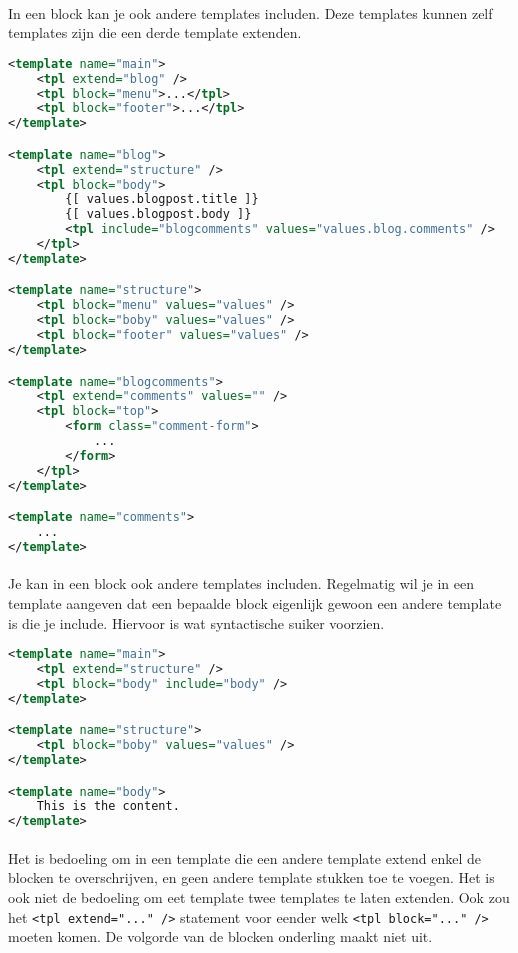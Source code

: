 \paragraph {} In een block kan je ook andere templates includen. Deze templates kunnen
zelf templates zijn die een derde template extenden.

\begin{lstlisting}[language=xml]
<template name="main">
	<tpl extend="blog" />
	<tpl block="menu">...</tpl>
	<tpl block="footer">...</tpl>
</template>

<template name="blog">
	<tpl extend="structure" />
	<tpl block="body">
		{[ values.blogpost.title ]}
		{[ values.blogpost.body ]}
		<tpl include="blogcomments" values="values.blog.comments" />
	</tpl>
</template>

<template name="structure">
	<tpl block="menu" values="values" />
	<tpl block="boby" values="values" />
	<tpl block="footer" values="values" />
</template>

<template name="blogcomments">
	<tpl extend="comments" values="" />
	<tpl block="top">
		<form class="comment-form">
			...
		</form>
	</tpl>
</template>

<template name="comments">
	...
</template>
\end{lstlisting}

\paragraph {} Je kan in een block ook andere templates includen. Regelmatig wil je in een
template aangeven dat een bepaalde block eigenlijk gewoon een andere template is die je
include. Hiervoor is wat syntactische suiker voorzien.

\begin{lstlisting}[language=xml]
<template name="main">
	<tpl extend="structure" />
	<tpl block="body" include="body" />
</template>

<template name="structure">
	<tpl block="boby" values="values" />
</template>

<template name="body">
	This is the content.
</template>
\end{lstlisting}

\paragraph {} Het is bedoeling om in een template die een andere template extend
enkel de blocken te overschrijven, en geen andere template stukken toe te voegen. Het is
ook niet de bedoeling om eet template twee templates te laten extenden. Ook zou het
\lstinline{<tpl extend="..." />} statement voor eender welk \lstinline{<tpl block="..." />}
moeten komen. De volgorde van de blocken onderling maakt niet uit.


